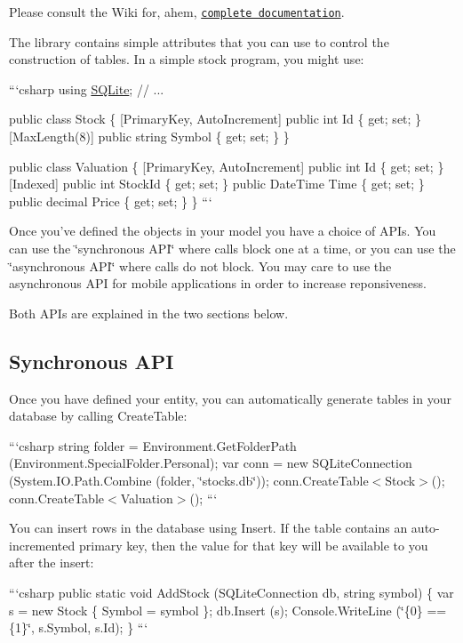 Please consult the Wiki for, ahem, \href{https://github.com/praeclarum/sqlite-net/wiki}{\tt complete documentation}.

The library contains simple attributes that you can use to control the construction of tables. In a simple stock program, you might use\+:

```csharp using \hyperlink{namespace_s_q_lite}{S\+Q\+Lite}; // ...

public class Stock \{ \mbox{[}Primary\+Key, Auto\+Increment\mbox{]} public int Id \{ get; set; \} \mbox{[}Max\+Length(8)\mbox{]} public string Symbol \{ get; set; \} \}

public class Valuation \{ \mbox{[}Primary\+Key, Auto\+Increment\mbox{]} public int Id \{ get; set; \} \mbox{[}Indexed\mbox{]} public int Stock\+Id \{ get; set; \} public Date\+Time Time \{ get; set; \} public decimal Price \{ get; set; \} \} ```

Once you've defined the objects in your model you have a choice of A\+P\+Is. You can use the \char`\"{}synchronous A\+P\+I\char`\"{} where calls block one at a time, or you can use the \char`\"{}asynchronous A\+P\+I\char`\"{} where calls do not block. You may care to use the asynchronous A\+P\+I for mobile applications in order to increase reponsiveness.

Both A\+P\+Is are explained in the two sections below.

\subsection*{Synchronous A\+P\+I}

Once you have defined your entity, you can automatically generate tables in your database by calling {\ttfamily Create\+Table}\+:

```csharp string folder = Environment.\+Get\+Folder\+Path (Environment.\+Special\+Folder.\+Personal); var conn = new S\+Q\+Lite\+Connection (System.\+I\+O.\+Path.\+Combine (folder, \char`\"{}stocks.\+db\char`\"{})); conn.\+Create\+Table$<$\+Stock$>$(); conn.\+Create\+Table$<$\+Valuation$>$(); ```

You can insert rows in the database using {\ttfamily Insert}. If the table contains an auto-\/incremented primary key, then the value for that key will be available to you after the insert\+:

```csharp public static void Add\+Stock (S\+Q\+Lite\+Connection db, string symbol) \{ var s = new Stock \{ Symbol = symbol \}; db.\+Insert (s); Console.\+Write\+Line (\char`\"{}\{0\} == \{1\}\char`\"{}, s.\+Symbol, s.\+Id); \} ```

